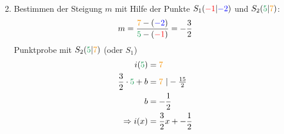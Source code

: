 \begin{Answer}[ref=punktprobeA2]
\begin{minipage}[t]{0.5\textwidth}
\begin{enumerate}[label=\alph*)]
\begin{align*}
			\end{align*}
			\item Bestimmen der Steigung $m$ mit Hilfe der Punkte $S_1(\textcolor{red}{-1}|\textcolor{blue}{-2})$ und $S_2(\textcolor{ForestGreen}{5}|\textcolor{YellowOrange}{7})$:
			\begin{align*}
				m=\dfrac{\textcolor{YellowOrange}{7}-\left(\textcolor{blue}{-2}\right)}{\textcolor{ForestGreen}{5}-\left(\textcolor{red}{-1}\right)}=-\dfrac{3}{2}
			\end{align*}
			Punktprobe mit $S_2(\textcolor{ForestGreen}{5}|\textcolor{YellowOrange}{7})$ (oder $S_1$)
			\begin{align*}
				i(\textcolor{ForestGreen}{5})&=\textcolor{YellowOrange}{7}\\
				\dfrac{3}{2}\cdot\textcolor{ForestGreen}{5}+b&=\textcolor{YellowOrange}{7}\ \vert -\tfrac{15}{2}\\
				b&=-\dfrac{1}{2}\\
				\Rightarrow i(x)&=\dfrac{3}{2}x+-\dfrac{1}{2}
			\end{align*}
		\end{enumerate}
	\end{minipage}
\end{Answer}